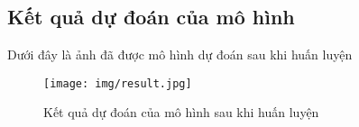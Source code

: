 \subsection{Kết quả dự đoán của mô hình}
Dưới đây là ảnh đã được mô hình dự đoán sau khi huấn luyện 
\begin{figure}[H]
\centering
\texttt{[image: img/result.jpg]}
\caption{Kết quả dự đoán của mô hình sau khi huấn luyện}
\label{fig:my_label_with_H}
\end{figure}



